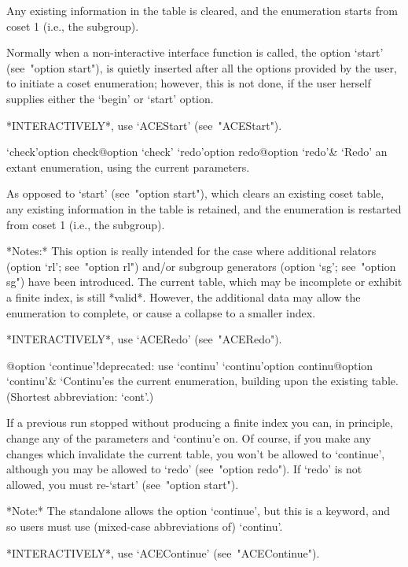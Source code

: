 Any existing information in the table is cleared, and the  enumeration
starts from coset 1 (i.e., the subgroup).

Normally when a non-interactive {\ACE} interface function  is  called,
the option `start' (see~"option start"), is quietly inserted after all
the options provided by the user, to  initiate  a  coset  enumeration;
however, this is not done, if the user  herself  supplies  either  the
`begin' or `start' option.

*INTERACTIVELY*, use `ACEStart' (see~"ACEStart").

\>`check'{option check}@{option `check'}
\>`redo'{option redo}@{option `redo'}&
`Redo' an extant enumeration, using the current parameters.

As opposed to `start' (see~"option start"), which clears  an  existing
coset table, any existing information in the table  is  retained,  and
the enumeration is restarted from coset 1 (i.e., the subgroup).

*Notes:*
This option is really intended for the case where additional  relators
(option `rl'; see~"option  rl")  and/or  subgroup  generators  (option
`sg'; see~"option sg") have been introduced. The current table,  which
may be incomplete  or  exhibit  a  finite  index,  is  still  *valid*.
However, the additional data may allow the enumeration to complete, or
cause a collapse to a smaller index.

*INTERACTIVELY*, use `ACERedo' (see~"ACERedo").

%
{@option \noexpand`continue'!deprecated: use \noexpand`continu'}
\>`continu'{option continu}@{option `continu'}&
`Continu'es the current enumeration, building upon the existing table.
(Shortest abbreviation: `cont'.)

If a previous run stopped without producing a finite index you can, in
principle, change any of the parameters and `continu'e on. Of  course,
if you make any changes which invalidate the current table, you  won't
be allowed to `continue',  although  you  may  be  allowed  to  `redo'
(see~"option redo"). If `redo' is not  allowed,  you  must  re-`start'
(see~"option start").

*Note:* The {\ACE} standalone allows the option `continue',  but  this
is a {\GAP} keyword, and so {\GAP} users  must  use
(mixed-case abbreviations of) `continu'.

*INTERACTIVELY*, use `ACEContinue' (see~"ACEContinue").

\enditems

